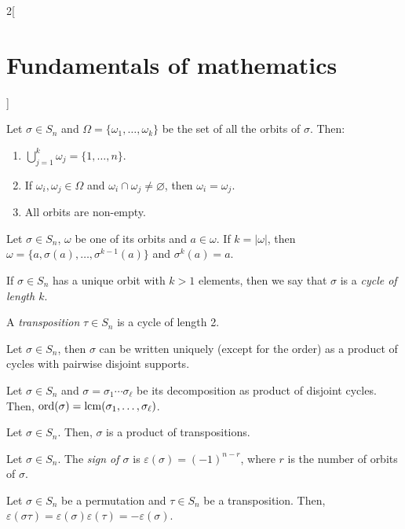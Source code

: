 \documentclass[../../../main.tex]{subfiles}
\begin{document}
\begin{multicols}{2}[\section{Fundamentals of mathematics}]
\begin{definition}
  \end{definition}
  \begin{theorem}
    Let $\sigma\in S_n$ and $\Omega=\{\omega_1,\ldots,\omega_k\}$ be the set of all the orbits of $\sigma$. Then:
    \begin{enumerate}
      \item $\bigcup_{j=1}^k \omega_j=\{1,\ldots,n\}$.
      \item If $\omega_i,\omega_j\in\Omega$ and $\omega_i\cap\omega_j\ne\varnothing$, then $\omega_i=\omega_j$.
      \item All orbits are non-empty.
    \end{enumerate}
  \end{theorem}
  \begin{theorem}
    Let $\sigma\in S_n$, $\omega$ be one of its orbits and $a\in\omega$. If $k=|\omega|$, then $\omega=\{a,\sigma(a),\ldots,\sigma^{k-1}(a)\}$ and $\sigma^k(a)=a$.
  \end{theorem}
  \begin{definition}
    If $\sigma\in S_n$ has a unique orbit with $k>1$ elements, then we say that $\sigma$ is a \textit{cycle of length $k$}.
  \end{definition}
  \begin{definition}
    A \textit{transposition} $\tau\in S_n$ is a cycle of length 2.
  \end{definition}
  \begin{theorem}
    Let $\sigma\in S_n$, then $\sigma$ can be written uniquely (except for the order) as a product of cycles with pairwise disjoint supports.
  \end{theorem}
  \begin{corollary}
    Let $\sigma\in S_n$ and $\sigma=\sigma_1\cdots\sigma_\ell$ be its decomposition as product of disjoint cycles. Then, $\text{ord}(\sigma)=\operatorname{lcm}(\sigma_1,\ldots,\sigma_\ell)$.
  \end{corollary}
  \begin{corollary}
    Let $\sigma\in S_n$. Then, $\sigma$ is a product of transpositions.
  \end{corollary}
  \begin{definition}
    Let $\sigma\in S_n$. The \textit{sign of $\sigma$} is $\varepsilon(\sigma)=(-1)^{n-r}$, where $r$ is the number of orbits of $\sigma$.
  \end{definition}
  \begin{theorem}
    Let $\sigma\in S_n$ be a permutation and $\tau\in S_n$ be a transposition. Then, $\varepsilon(\sigma\tau)=\varepsilon(\sigma)\varepsilon(\tau)=-\varepsilon(\sigma)$.

\end{theorem}
\end{multicols}
\end{document}
